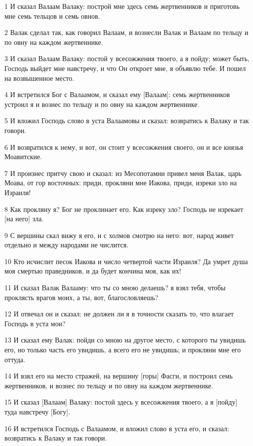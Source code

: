 \par 1 И сказал Валаам Валаку: построй мне здесь семь жертвенников и приготовь мне семь тельцов и семь овнов.
\par 2 Валак сделал так, как говорил Валаам, и вознесли Валак и Валаам по тельцу и по овну на каждом жертвеннике.
\par 3 И сказал Валаам Валаку: постой у всесожжения твоего, а я пойду; может быть, Господь выйдет мне навстречу, и что Он откроет мне, я объявлю тебе. И пошел на возвышенное место.
\par 4 И встретился Бог с Валаамом, и сказал ему [Валаам]: семь жертвенников устроил я и вознес по тельцу и по овну на каждом жертвеннике.
\par 5 И вложил Господь слово в уста Валаамовы и сказал: возвратись к Валаку и так говори.
\par 6 И возвратился к нему, и вот, он стоит у всесожжения своего, он и все князья Моавитские.
\par 7 И произнес притчу свою и сказал: из Месопотамии привел меня Валак, царь Моава, от гор восточных: приди, прокляни мне Иакова, приди, изреки зло на Израиля!
\par 8 Как прокляну я? Бог не проклинает его. Как изреку зло? Господь не изрекает [на него] зла.
\par 9 С вершины скал вижу я его, и с холмов смотрю на него: вот, народ живет отдельно и между народами не числится.
\par 10 Кто исчислит песок Иакова и число четвертой части Израиля? Да умрет душа моя смертью праведников, и да будет кончина моя, как их!
\par 11 И сказал Валак Валааму: что ты со мною делаешь? я взял тебя, чтобы проклясть врагов моих, а ты, вот, благословляешь?
\par 12 И отвечал он и сказал: не должен ли я в точности сказать то, что влагает Господь в уста мои?
\par 13 И сказал ему Валак: пойди со мною на другое место, с которого ты увидишь его, но только часть его увидишь, а всего его не увидишь; и прокляни мне его оттуда.
\par 14 И взял его на место стражей, на вершину [горы] Фасги, и построил семь жертвенников, и вознес по тельцу и по овну на каждом жертвеннике.
\par 15 И сказал [Валаам] Валаку: постой здесь у всесожжения твоего, а я [пойду] туда навстречу [Богу].
\par 16 И встретился Господь с Валаамом, и вложил слово в уста его, и сказал: возвратись к Валаку и так говори.
